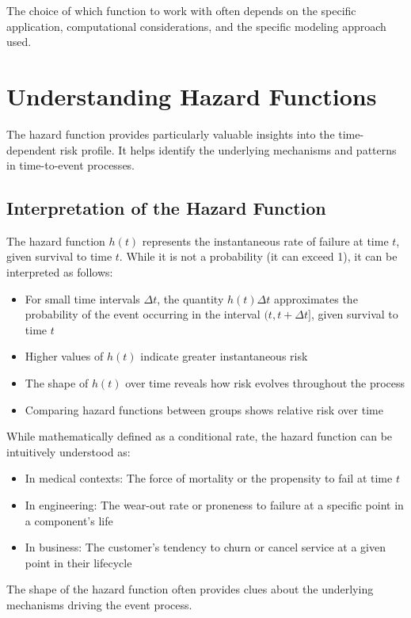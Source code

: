 The choice of which function to work with often depends on the specific application, computational considerations, and the specific modeling approach used.

\section{Understanding Hazard Functions}

The hazard function provides particularly valuable insights into the time-dependent risk profile. It helps identify the underlying mechanisms and patterns in time-to-event processes.

\subsection{Interpretation of the Hazard Function}

The hazard function $h(t)$ represents the instantaneous rate of failure at time $t$, given survival to time $t$. While it is not a probability (it can exceed 1), it can be interpreted as follows:

\begin{itemize}
    \item For small time intervals $\Delta t$, the quantity $h(t)\Delta t$ approximates the probability of the event occurring in the interval $(t, t+\Delta t]$, given survival to time $t$
    \item Higher values of $h(t)$ indicate greater instantaneous risk
    \item The shape of $h(t)$ over time reveals how risk evolves throughout the process
    \item Comparing hazard functions between groups shows relative risk over time
\end{itemize}

\begin{notebox}[title=Intuitive Interpretation]
While mathematically defined as a conditional rate, the hazard function can be intuitively understood as:
\begin{itemize}
    \item In medical contexts: The force of mortality or the propensity to fail at time $t$
    \item In engineering: The wear-out rate or proneness to failure at a specific point in a component's life
    \item In business: The customer's tendency to churn or cancel service at a given point in their lifecycle
\end{itemize}

The shape of the hazard function often provides clues about the underlying mechanisms driving the event process.
\end{notebox}

